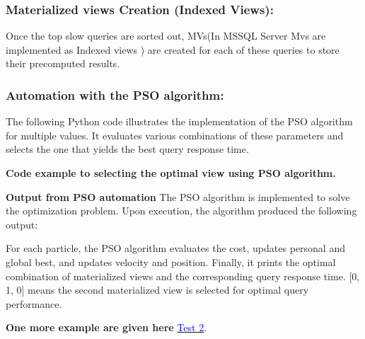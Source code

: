 \subsubsection{ Materialized views Creation (Indexed Views):}\label{Query_decomposition} Once the top slow queries are sorted out, MVs(In MSSQL Server Mvs are implemented as Indexed views ) are created for each of these queries to store their precomputed results.\vspace{.4cm}

  

  


\subsubsection{Automation with the PSO algorithm:} \label{Cost_evaluation}
 The following Python code illustrates the implementation of the PSO algorithm for multiple values. It evaluates various combinations of these parameters and selects the one that yields the best query response time.\vspace{.4cm}
 


\textbf{Code example to selecting the optimal view using PSO algorithm.} \vspace{.4cm}

   \vspace{.4cm}





\textbf{Output from PSO automation }  The PSO algorithm is implemented to solve the optimization problem. Upon execution, the algorithm produced the following output: \vspace{.4cm}

   \vspace{.4cm}
  
   \vspace{.4cm}

 For each particle, the PSO algorithm evaluates the cost, updates personal and global best, and updates velocity and position. Finally, it prints the optimal combination of materialized views and the corresponding query response time.
 [0, 1, 0] means the second materialized view is selected for optimal query performance.\vspace{.4cm}
  

\textbf{One more example are given here } \hyperref[test:Test2]{\textcolor{blue}{Test 2}}. \vspace{.4cm}

